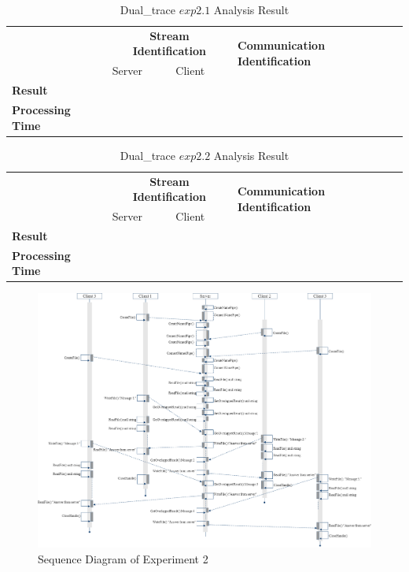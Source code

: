     \begin{table}[H]
        \centering
        \caption{Dual\_trace  $exp2.1$  Analysis Result}
        \label{result21}
        \begin{tabular}{|l|l|l|l|}
            \hline
             \multirow{2}{*}{\textbf{}} &
               \multicolumn{2}{c|}{\textbf{Stream Identification}} &
                \multirow{2}{*}{\textbf{Communication Identification}}\\
             \cline{2-3}
              &Server &Client &   \\
              \hline
              \textbf{Result} & & &   \\
             \hline
               \textbf{Processing Time}& \multicolumn{2}{c|}{}&  \\
              \hline
        \end{tabular}
    \end{table}

    \begin{table}[H]
        \centering
        \caption{Dual\_trace  $exp2.2$  Analysis Result}
        \label{result22}
        \begin{tabular}{|l|l|l|l|}
            \hline
             \multirow{2}{*}{\textbf{}} &
               \multicolumn{2}{c|}{\textbf{Stream Identification}} &
                \multirow{2}{*}{\textbf{Communication Identification}}\\
             \cline{2-3}
              &Server &Client &   \\
              \hline
              \textbf{Result} & & &   \\
             \hline
               \textbf{Processing Time}& \multicolumn{2}{c|}{}&  \\
              \hline
        \end{tabular}
    \end{table}



\begin{figure}[H]
\centerline{\includegraphics[scale=0.4]{Figures/exp2}}
 \caption{Sequence Diagram of Experiment 2}
\label{exp2}
\end{figure}

